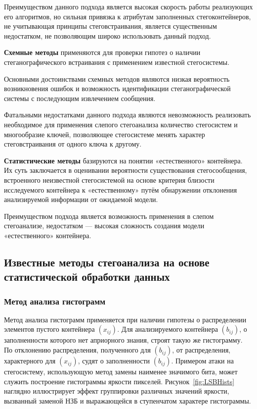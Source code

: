 Преимуществом данного подхода является высокая скорость работы реализующих его алгоритмов, но сильная привязка к атрибутам заполненных стегоконтейнеров, не учитывающая принципы стеговстраивания, является существенным недостатком, не позволяющим широко использовать данный подход.

\textbf{Схемные методы} применяются для проверки гипотез о наличии стеганографического встраивания с применением известной стегосистемы.

Основными достоинствами схемных методов являются низкая вероятность возникновения ошибок и возможность идентификации стеганографической системы с последующим извлечением сообщения.

Фатальными недостатками данного подхода являются невозможность реализовать необходимое для применения слепого стегоанализа количество стегосистем и многообразие ключей, позволяющее стегосистеме менять характер стеговстраивания от одного ключа к другому.

\textbf{Статистические методы} базируются на понятии «естественного» контейнера. Их суть заключается в оценивании вероятности существования стегосообщения, встроенного неизвестной стегосистемой на основе критерия близости исследуемого контейнера к «естественному» путём обнаружении отклонения анализируемой информации от ожидаемой модели.

Преимуществом подхода является возможность применения в слепом стегоанализе, недостатком — высокая сложность создания модели «естественного» контейнера.

\subsection{Известные методы стегоанализа на основе статистической обработки данных}

\subsubsection{Метод анализа гистограмм}

Метод анализа гистограмм применяется при наличии гипотезы о распределении элементов пустого контейнера $ (x_{ij}) $. Для анализируемого контейнера $ (b_{ij}) $, о заполненности которого нет априорного знания, строят такую же гистограмму. По отклонению распределения, полученного для $ (b_{ij}) $, от распределения, характерного для $ (x_{ij}) $, судят о заполненности $ (b_{ij}) $. Примером атаки на стегосистему, использующую метод замены наименее значимого бита, может служить построение гистограммы яркости пикселей. Рисунок~\ref{fig:LSBHists} наглядно иллюстрирует эффект группировки различных значений яркости, вызванный заменой НЗБ и выражающейся в ступенчатом характере гистограммы.

